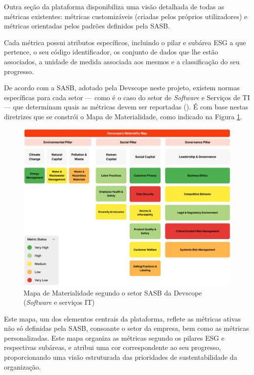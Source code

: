 Outra seção da plataforma disponibiliza uma visão detalhada de todas as métricas existentes: métricas customizáveis (criadas pelos próprios utilizadores) e métricas orientadas pelos padrões definidos pela \gls{SASB}.

Cada métrica possui atributos específicos, incluindo o pilar e subárea ESG a que pertence, o seu código identificador, os conjunto de dados que lhe estão associados, a unidade de medida associada aos mesmos e a classificação do seu progresso.

De acordo com a \gls{SASB}, adotado pela Devscope neste projeto, existem normas específicas para cada setor — como é o caso do setor de \textit{Software} e Serviços de TI — que determinam quais as métricas devem ser reportadas (\cite{SASBSector2025}). É com base nestas diretrizes que se constrói o Mapa de Materialidade, como indicado na Figura \ref{fig:materiality_map}.

\begin{figure}[H]
    \centering
    \includegraphics[width=5in]{frontmatter/assets/mapa-materialidade.png}
    \caption{Mapa de Materialidade segundo o setor SASB da Devscope (\textit{Software} e serviços IT)}
    \label{fig:materiality_map}
\end{figure}

Este mapa, um dos elementos centrais da plataforma, reflete as métricas ativas não só definidas pela \gls{SASB}, consoante o setor da empresa, bem como as métricas personalizadas. Este mapa organiza as métricas segundo os pilares ESG e respectivas subáreas, e atribui uma cor correspondente ao seu progresso, proporcionando uma visão estruturada das prioridades de sustentabilidade da organização.

